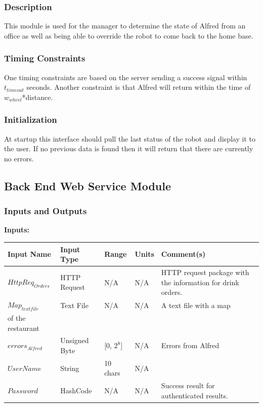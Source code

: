 \documentclass [10pt]{article}
\begin{document}
\subsubsection{Description}
This module is used for the manager to determine the state of Alfred from an office as well as being able to override the robot to come back to the home base. 
\subsubsection{Timing Constraints}
One timing constraints are based on the server sending a success signal within  $ t_{timeout} $ seconds. Another constraint is that Alfred will return within the time of $ w_{wheel} $*distance.

\subsubsection{Initialization}
At startup this interface should pull the last status of the robot and display it to the user. If no previous data is found then it will return that there are currently no errors.

\subsection{Back End Web Service Module}

\subsubsection{Inputs and Outputs}

\textbf{Inputs: } 

\begin{longtable}{|l|l|l|l|l|}\hline 
	\rowcolor{tableCell}Input Name & Input Type & Range & Units & Comment(s) \\ \hline
	$ HttpReq_{Orders} $ & HTTP Request & N/A & N/A & HTTP request package with the information for drink orders. \\ \hline
	$ Map_{textfile} $ & Text File & N/A & N/A & A text file with a map \\ of the restaurant \\ \hline
	$  errors_{Alfred} $ & Unsigned Byte & [0, $2^{8}$]& N/A & Errors from Alfred \\ \hline
	$  UserName $ & String & 10 chars & N/A & \\ \hline
	$  Password $ & HashCode & N/A & N/A &  Success result for authenticated results. \\ \hline
\end{longtable}
\end{document}

